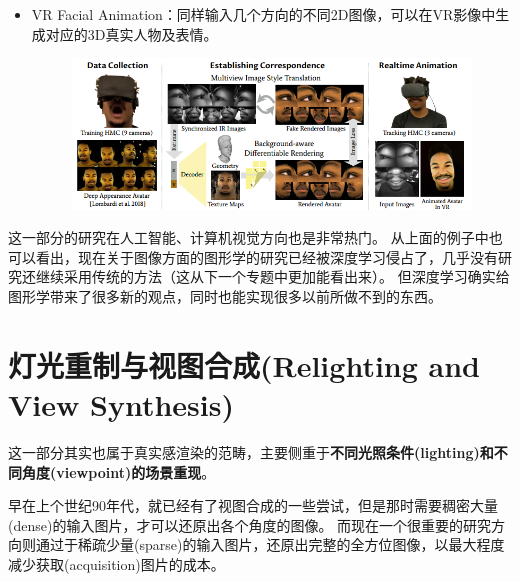 \documentclass[logo,reportComp]{thesis}
\begin{document}
\begin{itemize}
\begin{figure}[H]
\end{figure}
    \item VR Facial Animation\cite{wei:vr}：同样输入几个方向的不同2D图像，可以在VR影像中生成对应的3D真实人物及表情。
\begin{figure}[H]
\centering
\includegraphics[width=0.8\linewidth]{vr.png}
\end{figure}
\end{itemize}

这一部分的研究在人工智能、计算机视觉方向也是非常热门。
从上面的例子中也可以看出，现在关于图像方面的图形学的研究已经被深度学习侵占了，几乎没有研究还继续采用传统的方法（这从下一个专题中更加能看出来）。
但深度学习确实给图形学带来了很多新的观点，同时也能实现很多以前所做不到的东西。

\section{灯光重制与视图合成(Relighting and View Synthesis)}
\label{sec:view}
这一部分其实也属于真实感渲染的范畴，主要侧重于\textbf{不同光照条件(lighting)和不同角度(viewpoint)的场景重现}。

早在上个世纪90年代，就已经有了视图合成的一些尝试，但是那时需要稠密大量(dense)的输入图片，才可以还原出各个角度的图像。
而现在一个很重要的研究方向则通过于稀疏少量(sparse)的输入图片，还原出完整的全方位图像，以最大程度减少获取(acquisition)图片的成本。
\end{document}
